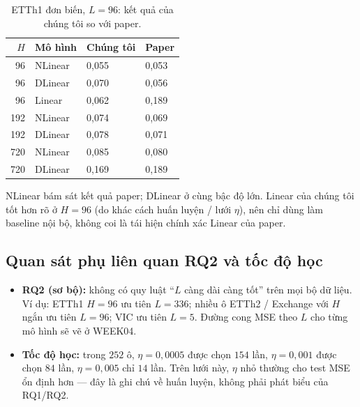 \begin{table}[H]
  \centering
  \caption{ETTh1 đơn biến, \(L{=}96\): kết quả của chúng tôi so với paper.}
  \label{tab:paper}
  \small
  \begin{tabular}{@{}rlll@{}}
    \toprule
    \(H\) & Mô hình & Chúng tôi & Paper   \\
    \midrule
    96    & NLinear & 0{,}055   & 0{,}053 \\
    96    & DLinear & 0{,}070   & 0{,}056 \\
    96    & Linear  & 0{,}062   & 0{,}189 \\
    192   & NLinear & 0{,}074   & 0{,}069 \\
    192   & DLinear & 0{,}078   & 0{,}071 \\
    720   & NLinear & 0{,}085   & 0{,}080 \\
    720   & DLinear & 0{,}169   & 0{,}189 \\
    \bottomrule
  \end{tabular}
\end{table}

NLinear bám sát kết quả paper; DLinear ở cùng bậc độ lớn.
Linear của chúng tôi tốt hơn rõ ở \(H{=}96\) (do khác cách huấn luyện / lưới \(\eta\)),
nên chỉ dùng làm baseline nội bộ, không coi là tái hiện chính xác Linear của paper.

\subsection{Quan sát phụ liên quan RQ2 và tốc độ học}

\begin{itemize}
  \item \textbf{RQ2 (sơ bộ):} không có quy luật ``\(L\) càng dài càng tốt'' trên mọi bộ dữ liệu.
        Ví dụ: ETTh1 \(H{=}96\) ưu tiên \(L{=}336\); nhiều ô ETTh2 / Exchange với \(H\) ngắn
        ưu tiên \(L{=}96\); VIC ưu tiên \(L{=}5\).
        Đường cong MSE theo \(L\) cho từng mô hình sẽ vẽ ở WEEK04.
  \item \textbf{Tốc độ học:} trong \(252\) ô, \(\eta{=}0{,}0005\) được chọn \(154\) lần,
        \(\eta{=}0{,}001\) được chọn \(84\) lần, \(\eta{=}0{,}005\) chỉ \(14\) lần.
        Trên lưới này, \(\eta\) nhỏ thường cho test MSE ổn định hơn ---
        đây là ghi chú về huấn luyện, không phải phát biểu của RQ1/RQ2.
\end{itemize}
